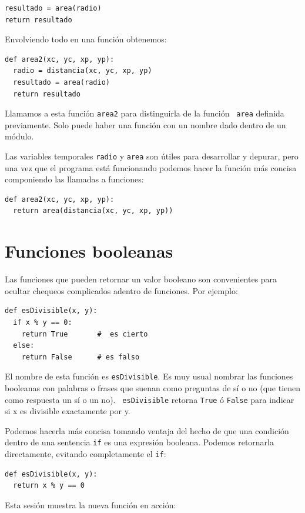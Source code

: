 \beforeverb
\begin{verbatim}
resultado = area(radio)
return resultado
\end{verbatim}
\afterverb
%
Envolviendo todo en una función obtenemos:

\beforeverb
\begin{verbatim}
def area2(xc, yc, xp, yp):
  radio = distancia(xc, yc, xp, yp)
  resultado = area(radio)
  return resultado
\end{verbatim}
\afterverb
%
Llamamos a esta función \texttt{area2} para distinguirla de la función {\tt
area} definida previamente.  Solo puede haber una función con un nombre
dado dentro de un módulo.

Las variables temporales \texttt{radio} y \texttt{area} son útiles para
desarrollar y depurar, pero una vez que el programa está funcionando
podemos hacer la función más concisa componiendo las llamadas a
funciones:

\beforeverb
\begin{verbatim}
def area2(xc, yc, xp, yp):
  return area(distancia(xc, yc, xp, yp))
\end{verbatim}
\afterverb
%


\section{Funciones booleanas}
\label{boolean}

Las funciones que pueden retornar un valor booleano son convenientes para
ocultar chequeos complicados adentro de funciones. Por ejemplo:

\beforeverb
\begin{verbatim}
def esDivisible(x, y):
  if x % y == 0:
    return True       #  es cierto
  else:
    return False      # es falso
\end{verbatim}
\afterverb
%
El nombre de esta función es \texttt{esDivisible}.  Es muy usual nombrar
las funciones booleanas con palabras o frases que suenan como preguntas de sí o no 
(que tienen como respuesta un sí o un no).  {\tt
esDivisible} retorna  \texttt{True} ó \texttt{False} para indicar si x es divisible
exactamente por y.

Podemos hacerla más concisa tomando ventaja del hecho de que una
condición dentro de una sentencia \texttt{if} es una expresión booleana. 
Podemos retornarla directamente, evitando completamente el \texttt{if}:

\beforeverb
\begin{verbatim}
def esDivisible(x, y):
  return x % y == 0
\end{verbatim}
\afterverb
%
Esta sesión muestra la nueva función en acción:

